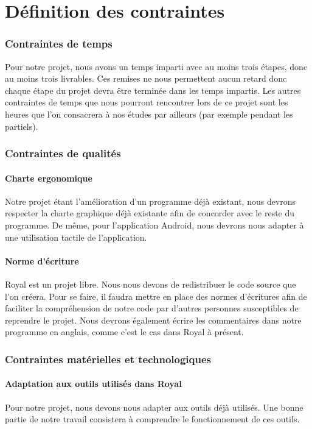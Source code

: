 \part{Définition des contraintes}


\section{Contraintes de temps}
Pour notre projet, nous avons un temps imparti avec au moins trois étapes, donc au moins trois livrables. Ces remises ne nous permettent aucun retard donc chaque étape du projet devra être terminée dans les temps impartis.
Les autres contraintes de temps que nous pourront rencontrer lors de ce projet sont les heures que l'on consacrera à nos études par ailleurs (par exemple pendant les partiels). 

\section{Contraintes de qualités}

\subsection{Charte ergonomique}
Notre projet étant l'amélioration d'un programme déjà existant, nous devrons respecter la charte graphique déjà existante afin de concorder avec le reste du programme. 
De même, pour l'application Android, nous devrons nous adapter à une utilisation tactile de l'application. 

\subsection{Norme d'écriture}
Royal est un projet libre. 
Nous nous devons de redistribuer le code source que l'on créera.
Pour se faire, il faudra mettre en place des normes d'écritures afin de faciliter la compréhension de notre code par d'autres personnes susceptibles de reprendre le projet. 
Nous devrons également écrire les commentaires dans notre programme en anglais, comme c'est le cas dans Royal à présent.

\section{Contraintes matérielles et technologiques}

\subsection{Adaptation aux outils utilisés dans Royal}
Pour notre projet, nous devons nous adapter aux outils déjà utilisés. Une bonne partie de notre travail consistera à comprendre le fonctionnement de ces outils.

